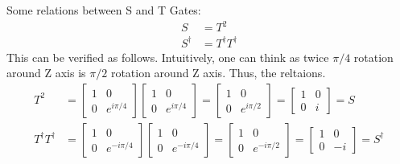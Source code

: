 Some relations between S and T Gates:
\begin{align*}
    S&=T^2 \\
    S^{\dagger}&=T^{\dagger}T^{\dagger}
\end{align*}
This can be verified as follows. Intuitively, one can think as twice $\pi/4$
rotation around Z axis is $\pi/2$ rotation around Z axis. Thus, the reltaions.
\begin{align*}
    T^2&=\begin{bmatrix}
        1 & 0 \\
        0 & e^{i\pi/4}
    \end{bmatrix}\begin{bmatrix}
        1 & 0 \\
        0 & e^{i\pi/4}
    \end{bmatrix}=\begin{bmatrix}
        1 & 0 \\
        0 & e^{i\pi/2}
    \end{bmatrix}=\begin{bmatrix}
        1 & 0 \\
        0 & i
    \end{bmatrix}=S \\
    T^{\dagger}T^{\dagger}&=\begin{bmatrix}
        1 & 0 \\
        0 & e^{-i\pi/4}
    \end{bmatrix}\begin{bmatrix}
        1 & 0 \\
        0 & e^{-i\pi/4}
    \end{bmatrix}=\begin{bmatrix}
        1 & 0 \\
        0 & e^{-i\pi/2}
    \end{bmatrix}=\begin{bmatrix}
        1 & 0 \\
        0 & -i
    \end{bmatrix}=S^{\dagger}
\end{align*}
